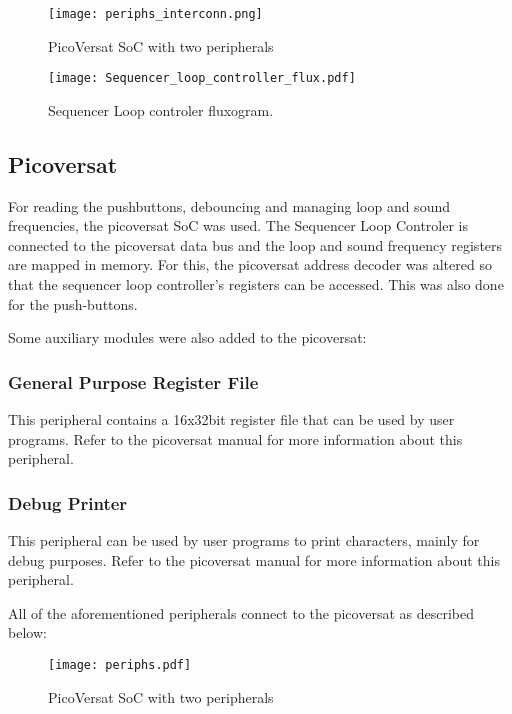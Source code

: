     \begin{figure}[!htbp]
      \centerline{\texttt{[image: periphs\_interconn.png]}}
      \vspace{0cm}\caption{PicoVersat SoC with two peripherals}
      \label{fig:periphs}
  \end{figure}

\begin{figure}[!htbp]
  \centerline{\texttt{[image: Sequencer\_loop\_controller\_flux.pdf]}}
  \vspace{0cm}\caption{Sequencer Loop controler fluxogram.}
  \label{fig:bd}
\end{figure}


\subsection{Picoversat}

For reading the pushbuttons, debouncing and managing loop and sound frequencies, the picoversat SoC was used. The Sequencer Loop Controler is connected to the picoversat data bus and the loop and sound frequency registers are mapped in memory. For this, the picoversat address decoder was altered so that the sequencer loop controller's registers can be accessed. This was also done for the push-buttons.

Some auxiliary modules were also added to the picoversat:

\subsubsection{General Purpose Register File}

This peripheral contains a 16x32bit register file that can be used by user
programs. Refer to the picoversat manual for more information about this peripheral. 


\subsubsection{Debug Printer}

This peripheral can be used by user programs to print characters, mainly for
debug purposes. Refer to the picoversat manual for more information about this peripheral.


All of the aforementioned peripherals connect to the picoversat as described below:

\begin{figure}[!htbp]
  \centerline{\texttt{[image: periphs.pdf]}}
  \vspace{0cm}\caption{PicoVersat SoC with two peripherals}
  \label{fig:periphs}
\end{figure}

